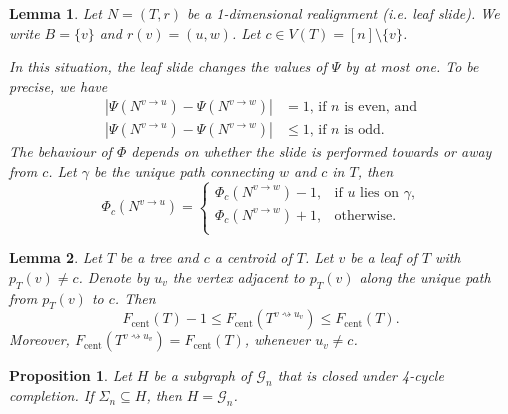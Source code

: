 \documentclass[10pt,a4paper]{amsart}
\newtheorem{lemma}{Lemma}
\newtheorem{proposition}{Proposition}
\begin{document}
\begin{lemma}\label{iter}
	Let $N = (T,r)$ be a 1-dimensional realignment (i.e. leaf slide). We write $B = \{v\}$ and  $r(v) = (u,w)$. Let $c\in V(T) = [n]\setminus\{v\}$.

	In this situation, the leaf slide changes the values of $\Psi$ by at most one. To be precise, we have
	\begin{equation}\label{Psiiter}
		\begin{split}
			|\Psi(N^{v\to u})-\Psi(N^{v\to w})|&  = 1\text{, if $n$ is even, and}\\
			|\Psi(N^{v\to u})-\Psi(N^{v\to w})|&  \leq 1\text{, if $n$ is odd.}
		\end{split}
	\end{equation}
	The behaviour of $\Phi$ depends on whether the slide is performed towards or away from $c$. Let $\gamma$ be the unique path connecting $w$ and $c$ in $T$, then
	\begin{equation}\label{Phiiter}
		\Phi_c(N^{v\to u}) = 
		\begin{cases}
			\Phi_c(N^{v\to w}) - 1, &\text{if $u$ lies on $\gamma$,}\\
			\Phi_c(N^{v\to w}) + 1, &\text{otherwise.}\\
		\end{cases}
	\end{equation}
\end{lemma} 

		\begin{lemma} \label{lem:MaxComponentLeafSlide}
			Let $T$ be a tree and $c$ a centroid of $T$. Let $v$ be a leaf of $T$ with $p_T(v) \neq c$. Denote by $u_v$ the vertex adjacent to $p_T(v)$ along the unique path from $p_T(v)$ to $c$. Then
			\[
				F_\mathrm{cent}(T) - 1 \leq F_\mathrm{cent}(T^{v\rightsquigarrow u_v}) \leq F_\mathrm{cent}(T).
			\]
			Moreover, $F_\mathrm{cent}(T^{v\rightsquigarrow u_v}) = F_\mathrm{cent}(T)$, whenever $u_v \neq c$.
		\end{lemma}

		\begin{proposition} \label{prop:FourCycleCompletion}
			Let $H$ be a subgraph of $\mathcal{G}_n$ that is closed under 4-cycle completion. If $\Sigma_n \subseteq H$, then $H = \mathcal{G}_n$.
		\end{proposition}
\end{document}
